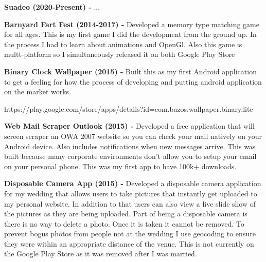 \documentclass[a4paper,online]{adcv}
\begin{document}
\begin{adcvtabletwo}
  \textbf{Suadeo (2020-Present) - }
  ...
  
  \adcvrowskip
  \adcvrowskip
  
  \textbf{Barnyard Fart Fest (2014-2017) - }
  Developed a memory type matching game for all ages.  This is my first game I did the development from the ground up.  In the process I had to learn about animations and OpenGl.  Also this game is multt-platform so I simultaneously released it on both Google Play Store
  
  \adcvrowskip
  \adcvrowskip
  
  \textbf{Binary Clock Wallpaper (2015) - }
  Built this as my first Android application to get a feeling for how the process of developing and putting android application on the market works.
  
  https://play.google.com/store/apps/details?id=com.bazos.wallpaper.binary.lite
  
  \adcvrowskip
  \adcvrowskip
  
  \textbf{Web Mail Scraper Outlook (2015) - }
  Developed a free application that will screen scraper an OWA 2007 website so you can check your mail natively on your Android device. Also includes notifications when new messages arrive.  This was built because many corporate environments don’t allow you to setup your email on your personal phone. This was my first app to have 100k+ downloads.
  
  \adcvrowskip
  \adcvrowskip
  \textbf{Disposable Camera App (2015) - }
  Developed a disposable camera application for my wedding that allows users to take pictures that instantly get uploaded to my personal website.  In addition to that users can also view a live slide show of the pictures as they are being uploaded.  Part of being a disposable camera is there is no way to delete a photo.  Once it is taken it cannot be removed.  To prevent bogus photos from people not at the wedding I use geocoding to ensure they were within an appropriate distance of the venue.  This is not currently on the Google Play Store as it was removed after I was married.
\end{adcvtabletwo}
\end{document}
